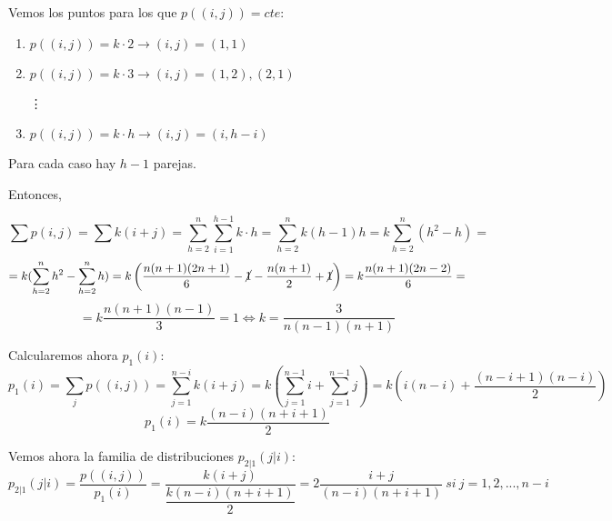 \documentclass[openany]{book}
\begin{document}
\begin{exercise}

    Vemos los puntos para los que $ p((i,j)) = cte $:
    \begin{enumerate}
        \item $ p((i,j)) = k \cdot 2 \to (i,j) = (1,1)$
        \item $ p((i,j)) = k \cdot 3 \to (i,j) = (1,2),(2,1)$

        \hspace{2cm}\vdots
        \item $ p((i,j)) = k \cdot h \to (i,j) = (i,h-i) $
    \end{enumerate}

    Para cada caso hay $ h-1 $ parejas.

    Entonces, 
    
    $$ \sum\limits_{}^{}p(i,j) = \sum\limits_{}^{} k (i+j) = \sum\limits_{h=2}^{n} \sum\limits_{i=1}^{h-1}k \cdot h = \sum\limits_{h=2}^{n} k (h-1) h = k \sum\limits_{h=2}^{n}(h^2-h) = $$
    $$ = k (\sum\limits_{h=2}^{n}h ^2- \sum\limits_{h=2}^{n}h) = k\left(\dfrac{n(n+1)(2n+1)}{6}-\cancel{1}-\dfrac{n(n+1)}{2}+\cancel{1}\right) = k \dfrac{n(n+1)(2n-2)}{6} = $$
    $$= k \dfrac{n(n+1)(n-1)}{3} = 1 \iff k = \dfrac{3}{n(n-1)(n+1)}$$

    Calcularemos ahora $ p_1(i) $:
    $$ p_1(i) = \sum\limits_{j}^{}p((i,j)) = \sum\limits_{j=1}^{n-i}k(i+j) = k \left( \sum\limits_{j=1}^{n-1}i + \sum\limits_{j=1}^{n-1}j \right) = k \left(i(n-i)+\dfrac{(n-i+1)(n-i)}{2}\right)  $$
    $$ p_1(i) = k \dfrac{(n-i)(n+i+1)}{2} $$

    Vemos ahora la familia de distribuciones $ p_{2|1}(j|i) $:
    $$ p_{2|1}(j|i) = \dfrac{p((i,j))}{p_1(i)} = \dfrac{k(i+j)}{\dfrac{k(n-i)(n+i+1)}{2}} = 2\dfrac{i+j}{(n-i)(n+i+1)}\ si\ j=1,2,...,n-i$$

\end{exercise}
\end{document}

